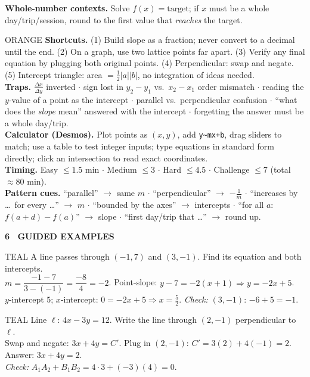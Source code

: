 \documentclass[10pt]{article}
\newcommand{\banner}[1]{\vspace{6pt}\par\noindent\begin{tcolorbox}[enhanced,colback=NAVY,colframe=NAVY,boxrule=0pt,arc=2pt,left=6pt,top=1pt,bottom=1pt,nobeforeafter]\color{white}\bfseries\small\MakeUppercase{#1}\end{tcolorbox}\par\nopagebreak\vspace{2pt}}
\begin{document}
\textbf{Whole-number contexts.} Solve $f(x)=\text{target}$; if $x$ must be a whole day/trip/session, round to the first value that \emph{reaches} the target.
\begin{cbox}[title={5 \textperiodcentered\ Strategy Box}]{ORANGE}
\textbf{Shortcuts.} (1) Build slope as a fraction; never convert to a decimal until the end. (2) On a graph, use two lattice points far apart. (3) Verify any final equation by plugging both original points. (4) Perpendicular: swap and negate. (5) Intercept triangle: area $=\frac12|a||b|$, no integration of ideas needed.\\
\textbf{Traps.} $\frac{\Delta x}{\Delta y}$ inverted $\cdot$ sign lost in $y_2-y_1$ vs.\ $x_2-x_1$ order mismatch $\cdot$ reading the $y$-value of a point as the intercept $\cdot$ parallel vs.\ perpendicular confusion $\cdot$ ``what does the \emph{slope} mean'' answered with the intercept $\cdot$ forgetting the answer must be a whole day/trip.\\
\textbf{Calculator (Desmos).} Plot points as $(x,y)$, add \texttt{y\textasciitilde mx+b}, drag sliders to match; use a table to test integer inputs; type equations in standard form directly; click an intersection to read exact coordinates.\\
\textbf{Timing.} Easy $\le1.5$ min $\cdot$ Medium $\le3$ $\cdot$ Hard $\le4.5$ $\cdot$ Challenge $\le7$ (total $\approx80$ min).\\
\textbf{Pattern cues.} ``parallel'' $\to$ same $m$ $\cdot$ ``perpendicular'' $\to$ $-\frac1m$ $\cdot$ ``increases by \dots\ for every \dots'' $\to$ $m$ $\cdot$ ``bounded by the axes'' $\to$ intercepts $\cdot$ ``for all $a$: $f(a+d)-f(a)$'' $\to$ slope $\cdot$ ``first day/trip that \dots'' $\to$ round up.\end{cbox}
\banner{6 \textperiodcentered\ Guided Examples}
\begin{cbox}[title={Example 1 \textemdash\ Two points $\to$ equation $\to$ intercepts}]{TEAL}
A line passes through $(-1,7)$ and $(3,-1)$. Find its equation and both intercepts.\\[2pt]
$m=\dfrac{-1-7}{3-(-1)}=\dfrac{-8}{4}=-2$. Point-slope: $y-7=-2(x+1)\Rightarrow y=-2x+5$.\\
$y$-intercept $5$; $x$-intercept: $0=-2x+5\Rightarrow x=\frac52$. \emph{Check:} $(3,-1)$: $-6+5=-1$. \checkmark
\end{cbox}
\begin{cbox}[title={Example 2 \textemdash\ Perpendicular through a point (standard form)}]{TEAL}
Line $\ell$: $4x-3y=12$. Write the line through $(2,-1)$ perpendicular to $\ell$.\\[2pt]
Swap and negate: $3x+4y=C'$. Plug in $(2,-1)$: $C'=3(2)+4(-1)=2$. Answer: $3x+4y=2$.\\
\emph{Check:} $A_1A_2+B_1B_2=4\cdot3+(-3)(4)=0$. \checkmark
\end{cbox}
\end{document}
